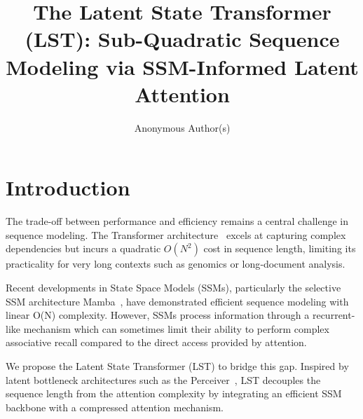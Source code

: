 \documentclass[10pt,twocolumn,letterpaper]{article}
\title{\textbf{The Latent State Transformer (LST): Sub-Quadratic Sequence Modeling via SSM-Informed Latent Attention}}
\author[1]{Anonymous Author(s)}
\affil[1]{Research Institution}
\date{}
\begin{document}

\section{Introduction}

The trade-off between performance and efficiency remains a central challenge in sequence modeling. The Transformer architecture~\cite{vaswani2017attention} excels at capturing complex dependencies but incurs a quadratic \(O(N^{2})\) cost in sequence length, limiting its practicality for very long contexts such as genomics or long‑document analysis.

Recent developments in State Space Models (SSMs), particularly the selective SSM architecture Mamba~\cite{gu2023mamba}, have demonstrated efficient sequence modeling with linear O(N) complexity. However, SSMs process information through a recurrent-like mechanism which can sometimes limit their ability to perform complex associative recall compared to the direct access provided by attention.

We propose the Latent State Transformer (LST) to bridge this gap. Inspired by latent bottleneck architectures such as the Perceiver~\cite{jaegle2021perceiver}, LST decouples the sequence length from the attention complexity by integrating an efficient SSM backbone with a compressed attention mechanism.
\end{document}
